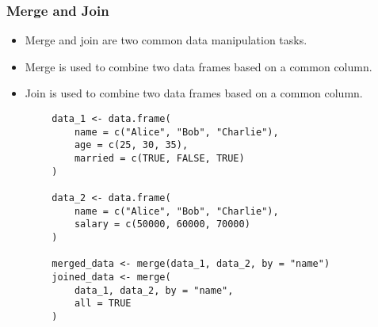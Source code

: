 \documentclass[serif, 9pt, aspectratio=32]{beamer}
\begin{document}
\begin{frame}
    \centering
    \frametitle{Merge and Join}
    \begin{itemize}
        \setlength{\itemsep}{2em}
        \item Merge and join are two common data manipulation tasks.
        \item Merge is used to combine two data frames based on a common column.
        \item Join is used to combine two data frames based on a common column.
    \end{itemize}
\end{frame}

\begin{frame}[fragile]
    \begin{lstlisting}
        data_1 <- data.frame(
            name = c("Alice", "Bob", "Charlie"),
            age = c(25, 30, 35),
            married = c(TRUE, FALSE, TRUE)
        )

        data_2 <- data.frame(
            name = c("Alice", "Bob", "Charlie"),
            salary = c(50000, 60000, 70000)
        )

        merged_data <- merge(data_1, data_2, by = "name")
        joined_data <- merge(
            data_1, data_2, by = "name",
            all = TRUE
        )
    \end{lstlisting}
\end{frame}
\end{document}
